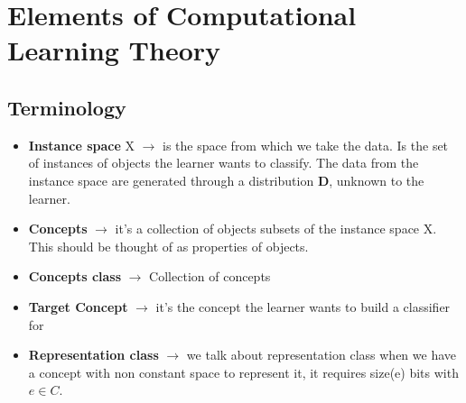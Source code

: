 \chapter{Elements of Computational Learning Theory}
\label{ch:computational-learning}


\section{Terminology}
\begin{itemize}
	\item \textbf{Instance space} X \(\rightarrow\) is the space from which we take the data. Is the set of instances of objects the learner wants to classify. The data from the instance space are generated through a distribution \textbf{D}, unknown to the learner.
	\item \textbf{Concepts} \(\rightarrow\) it's a collection of objects subsets of the instance space X. This should be thought of as properties of objects.
	\item \textbf{Concepts class} \(\rightarrow\) Collection of concepts
	\item \textbf{Target Concept} \(\rightarrow\) it's the concept the learner wants to build a classifier for
	\item \textbf{Representation class} \(\rightarrow\) we talk about representation class when we have a concept with non constant space to represent it, it requires size(e) bits with \(e \in C\).
\end{itemize}

